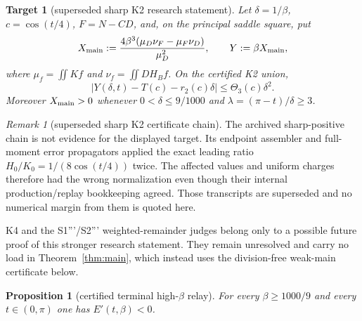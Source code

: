 \documentclass[11pt]{article}
\newtheorem{proposition}[theorem]{Proposition}
\newtheorem{target}[theorem]{Target}
\theoremstyle{remark}
\newtheorem{remark}[theorem]{Remark}
\begin{document}
\begin{target}[superseded sharp K2 research statement]
\label{prop:k2endpoint}
Let $\delta=1/\beta$, $c=\cos(t/4)$, $F=N-CD$, and, on the principal
saddle square, put
\[
 X_{\rm main}:=
 \frac{4\beta^3(\mu_D\nu_F-\mu_F\nu_D)}{\mu_D^2},
 \qquad Y:=\beta X_{\rm main},
\]
where $\mu_f=\iint Kf$ and $\nu_f=\iint D H_B f$.  On the certified
K2 union,
\[
\bigl|Y(\delta,t)-T(c)-r_2(c)\delta\bigr|
\le \Theta_3(c)\delta^2.
\]
Moreover $X_{\rm main}>0$ whenever
$0<\delta\le9/1000$ and
$\lambda=(\pi-t)/\delta\ge3$.
\end{target}

\begin{remark}[superseded sharp K2 certificate chain]
The archived sharp-positive chain is not evidence for the displayed target.
Its endpoint assembler and full-moment error propagators applied the exact
leading ratio $H_0/K_0=1/(8\cos(t/4))$ twice.  The affected values and
uniform charges therefore had the wrong normalization even though their
internal production/replay bookkeeping agreed.  Those transcripts are
superseded and no numerical margin from them is quoted here.

K4 and the S1'''/S2''' weighted-remainder judges belong only to a possible
future proof of this stronger research statement.  They remain unresolved
and carry no load in Theorem~\ref{thm:main}, which instead uses the
division-free weak-main certificate below.
\end{remark}

\begin{proposition}[certified terminal high-$\beta$ relay]
\label{prop:highbeta}
For every $\beta\ge1000/9$ and every $t\in(0,\pi)$ one has
$E'(t,\beta)<0$.
\end{proposition}
\end{document}
